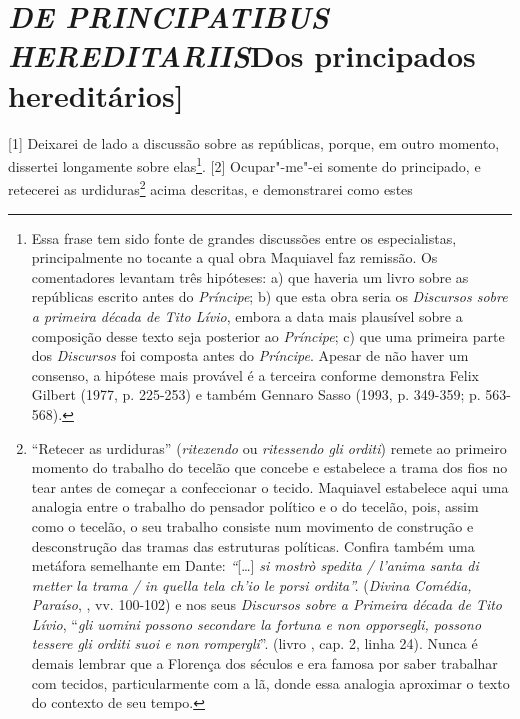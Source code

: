 \quebra\section{\emph{DE PRINCIPATIBUS HEREDITARIIS}\break {[}Dos principados hereditários{]}}

{[}1{]} Deixarei de lado a discussão sobre as repúblicas, porque, em
outro momento, dissertei longamente sobre elas\footnote{Essa frase tem
  sido fonte de grandes discussões entre os especialistas,
  principalmente no tocante a qual obra Maquiavel faz remissão. Os
  comentadores levantam três hipóteses: a) que haveria um livro sobre as
  repúblicas escrito antes do \emph{Príncipe}; b) que esta obra seria os
  \emph{Discursos sobre a primeira década de Tito Lívio}, embora a data
  mais plausível sobre a composição desse texto seja posterior ao
  \emph{Príncipe}; c) que uma primeira parte dos \emph{Discursos} foi
  composta antes do \emph{Príncipe}. Apesar de não haver um consenso, a
  hipótese mais provável é a terceira conforme demonstra Felix Gilbert
  (1977, p. 225-253) e também Gennaro Sasso (1993, p. 349-359; p.
  563-568).}. {[}2{]} Ocupar"-me"-ei somente do principado, e retecerei as
urdiduras\footnote{``Retecer as urdiduras'' (\emph{ritexendo} ou
  \emph{ritessendo gli orditi}) remete ao primeiro momento do trabalho
  do tecelão que concebe e estabelece a trama dos fios no tear antes de
  começar a confeccionar o tecido. Maquiavel estabelece aqui uma
  analogia entre o trabalho do pensador político e o do tecelão, pois,
  assim como o tecelão, o seu trabalho consiste num movimento de
  construção e desconstrução das tramas das estruturas políticas.
  Confira também uma metáfora semelhante em Dante: \emph{``}{[}\ldots{}{]}
  \emph{si mostrò spedita / l'anima santa di metter la trama / in quella
  tela ch'io le porsi ordita''.} (\emph{Divina Comédia, Paraíso}, ,
  vv. 100-102) e nos seus \emph{Discursos sobre a Primeira década de
  Tito Lívio}, ``\emph{gli uomini possono secondare la fortuna e non
  opporsegli, possono tessere gli orditi suoi e non rompergli}''. (livro
  , cap. 2, linha 24). Nunca é demais lembrar que a Florença dos
  séculos  e  era famosa por saber trabalhar com tecidos,
  particularmente com a lã, donde essa analogia aproximar o texto do
  contexto de seu tempo.} acima descritas, e demonstrarei como estes
